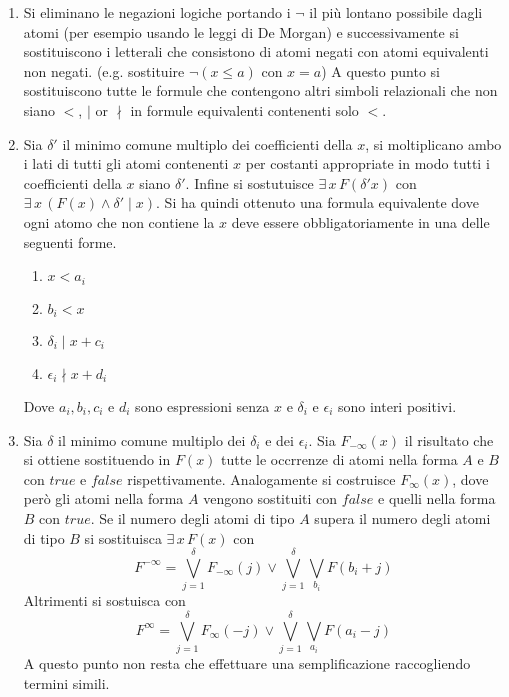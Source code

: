 \documentclass[11pt,letterpaper,twoside]{article}
\begin{document}
\begin{enumerate}[label=Step \arabic*.]
\item Si eliminano le negazioni logiche portando i $\lnot$ il più lontano
  possibile dagli atomi (per esempio usando le leggi di De Morgan) e
  successivamente si sostituiscono i letterali che consistono di atomi negati con
  atomi equivalenti non negati. (e.g. sostituire $\lnot (x \leq a)$ con $x = a$)
  A questo punto si sostituiscono tutte le formule che contengono altri simboli
  relazionali che non siano $<$, $\mid$ or $\nmid$ in formule equivalenti
  contenenti solo $<$.
\item Sia $\delta'$ il minimo comune multiplo dei coefficienti della $x$, si
  moltiplicano ambo i lati di tutti gli atomi contenenti $x$ per costanti
  appropriate in modo tutti i coefficienti della $x$ siano $\delta'$.
  Infine si sostutuisce $\exists \, x \, F(\delta' x)$ con $\exists \, x \,
  (F(x) \land \delta' \mid x)$.
  Si ha quindi ottenuto una formula equivalente dove ogni atomo che non contiene
  la $x$ deve essere obbligatoriamente in una delle seguenti forme.
  \begin{enumerate}[label=\Alph*.]
    \item $x < a_i$
    \item $b_i < x$
    \item $\delta_i \mid x + c_i$
    \item $\epsilon_i \nmid x + d_i$
  \end{enumerate}
  Dove $a_i, b_i, c_i$ e $d_i$ sono espressioni senza $x$ e $\delta_i$ e
  $\epsilon_i$ sono interi positivi.
\item Sia $\delta$ il minimo comune multiplo dei $\delta_i$ e dei
  $\epsilon_i$. Sia $F_{- \infty}(x)$ il risultato che si ottiene sostituendo in
  $F(x)$ tutte le occrrenze di atomi nella forma $A$ e $B$ con $true$ e
  $false$ rispettivamente. Analogamente si costruisce $F_{\infty}(x)$, dove però
  gli atomi nella forma $A$ vengono sostituiti con $false$ e quelli nella forma
  $B$ con $true$.
  Se il numero degli atomi di tipo $A$ supera il numero degli atomi di tipo $B$
  si sostituisca $\exists \, x \, F(x)$ con
  $$ F^{-\infty} =  \bigvee_{j=1}^{\delta} F_{- \infty}(j) \lor
  \bigvee_{j=1}^{\delta} \bigvee_{b_i} F(b_i + j)$$
  Altrimenti si sostuisca con
  $$ F^{\infty} =  \bigvee_{j=1}^{\delta} F_{\infty}(-j) \lor
  \bigvee_{j=1}^{\delta} \bigvee_{a_i} F(a_i - j)$$
  A questo punto non resta che effettuare una semplificazione raccogliendo
  termini simili.
\end{enumerate}
\end{document}
